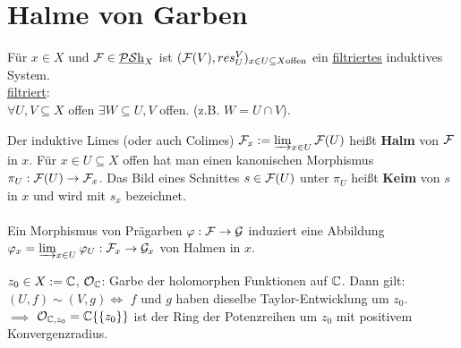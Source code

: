 \section{Halme von Garben}
\label{sec:halme}

Für $x \in X$ und $\mathcal{F} \in \operatorname{\underline{\mathcal{PS}h}}_{X}$ ist $(\mathcal{F}(V), res^{V}_{U})_{x \in U \subseteq X \text{offen}}$ ein \underline{filtriertes} induktives System.\\
\underline{filtriert}:\\
$\forall U,V \subseteq X$ offen $\exists W \subseteq U,V$ offen. (z.B. $W = U \cap V$).\\

\begin{defn}
\label{def:halm}
Der induktive Limes (oder auch Colimes) $\mathcal{F}_{x} := \varinjlim_{x \in U} \mathcal{F}(U)$ heißt \textbf{Halm} von $\mathcal{F}$ in $x$. Für $x \in U \subseteq X$ offen hat man einen kanonischen Morphismus $\pi_{U} : \mathcal{F}(U) \to \mathcal{F}_{x}$. Das Bild eines Schnittes $s \in \mathcal{F}(U)$ unter $\pi_{U}$ heißt \textbf{Keim} von $s$ in $x$ und wird mit $s_{x}$ bezeichnet.\\
\\
Ein Morphismus von Prägarben $\varphi: \mathcal{F} \to \mathcal{G}$ induziert eine Abbildung $\varphi_{x} = \varinjlim_{x \in U} \varphi_{U} : \mathcal{F}_{x} \to \mathcal{G}_{x}$ von Halmen in $x$.
\end{defn}

\begin{example}
\label{bsp:einige-halme}
$z_0 \in X := \operatorname{\mathbb{C}}$, $\mathcal{O}_{\operatorname{\mathbb{C}}}$: Garbe der holomorphen Funktionen auf $\operatorname{\mathbb{C}}$. Dann gilt: $(U, f) \sim (V,g) \iff$ $f$ und $g$ haben dieselbe Taylor-Entwicklung um $z_0$. \\$\implies$ $\mathcal{O}_{\operatorname{\mathbb{C}}, z_0} = \operatorname{\mathbb{C}}\{\{z_0 \}\}$ ist der Ring der Potenzreihen um $z_0$ mit positivem Konvergenzradius.
\end{example}

